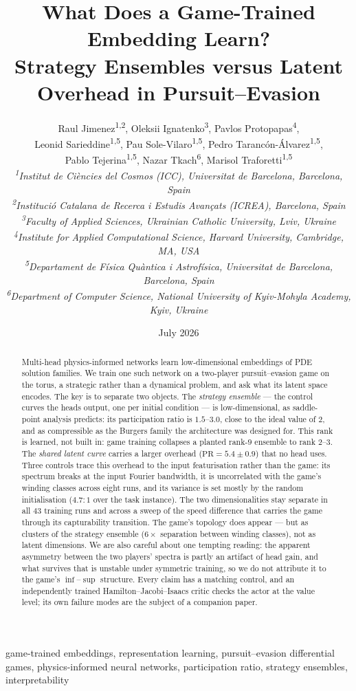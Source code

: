 \documentclass[twoside,11pt]{article}
\title{What Does a Game-Trained Embedding Learn?\\
Strategy Ensembles versus Latent Overhead in Pursuit--Evasion}
\author{Raul Jimenez\textsuperscript{1,2}, Oleksii Ignatenko\textsuperscript{3}, Pavlos Protopapas\textsuperscript{4},\\
Leonid Sarieddine\textsuperscript{1,5}, Pau Sole-Vilaro\textsuperscript{1,5}, Pedro Tarancón-Álvarez\textsuperscript{1,5},\\
Pablo Tejerina\textsuperscript{1,5}, Nazar Tkach\textsuperscript{6}, Marisol Traforetti\textsuperscript{1,5}\\[1ex]
\normalfont\small\itshape
\textsuperscript{1}Institut de Ciències del Cosmos (ICC), Universitat de Barcelona, Barcelona, Spain\\
\textsuperscript{2}Institució Catalana de Recerca i Estudis Avançats (ICREA), Barcelona, Spain\\
\textsuperscript{3}Faculty of Applied Sciences, Ukrainian Catholic University, Lviv, Ukraine\\
\textsuperscript{4}Institute for Applied Computational Science, Harvard University, Cambridge, MA, USA\\
\textsuperscript{5}Departament de Física Quàntica i Astrofísica, Universitat de Barcelona, Barcelona, Spain\\
\textsuperscript{6}Department of Computer Science, National University of Kyiv-Mohyla Academy, Kyiv, Ukraine}
\date{July 2026}
\newcommand{\PR}{\mathrm{PR}}
\begin{document}

\maketitle

\begin{abstract}
Multi-head physics-informed networks learn low-dimensional embeddings
of PDE solution families.  We train one such network on a two-player
pursuit--evasion game on the torus, a strategic rather than a
dynamical problem, and ask what its latent space encodes.  The key is
to separate two objects.  The \emph{strategy ensemble} --- the control
curves the heads output, one per initial condition --- is
low-dimensional, as saddle-point analysis predicts: its participation
ratio is $1.5$--$3.0$, close to the ideal value of $2$, and as
compressible as the Burgers family the architecture was designed for.
This rank is learned, not built in: game training collapses a planted
rank-$9$ ensemble to rank $2$--$3$.  The \emph{shared latent curve} carries a larger overhead
($\PR = 5.4 \pm 0.9$) that no head uses.  Three controls trace this
overhead to the input featurisation rather than the game: its spectrum
breaks at the input Fourier bandwidth, it is uncorrelated with the
game's winding classes across eight runs, and its variance is set
mostly by the random initialisation ($4.7\!:\!1$ over the task
instance).  The two dimensionalities stay separate in all $43$
training runs and across a sweep of the speed difference that carries
the game through its capturability transition.  The game's topology does appear --- but as clusters of the strategy
ensemble ($6\times$ separation between winding classes), not as latent
dimensions.  We are also careful about one tempting reading: the
apparent asymmetry between the two players' spectra is partly an
artifact of head gain, and what survives that is unstable under
symmetric training, so we do not attribute it to the game's
$\inf$--$\sup$ structure.  Every claim has a matching control, and an
independently trained Hamilton--Jacobi--Isaacs critic checks the actor
at the value level; its own failure modes are the subject of a
companion paper.
\end{abstract}

\begin{keywords}
  game-trained embeddings, representation learning, pursuit--evasion
  differential games, physics-informed neural networks, participation ratio,
  strategy ensembles, interpretability
\end{keywords}
\end{document}
